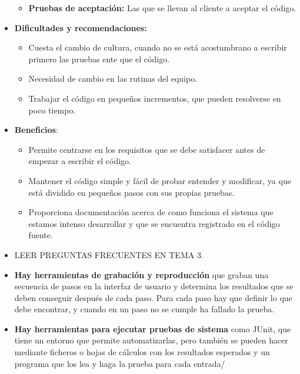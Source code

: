 \documentclass[12pt, twoside, openright]{report} %
\begin{document}
\begin{itemize}
\begin{itemize}
  \item \textbf{Pruebas de aceptación:} Las que se llevan al cliente a
    aceptar el código.
    
  \end{itemize}
\item \textbf{Dificultades y recomendaciones:}
  

  \begin{itemize}
  \item Cuesta el cambio de cultura, cuando no se está acostumbrano a
    escribir primero las pruebas ente que el código.
    
  \item Necesidad de cambio en las rutinas del equipo.
    
  \item Trabajar el código en pequeños incrementos, que pueden resolverse en
    poco tiempo.
    
  \end{itemize}
\item \textbf{Beneficios}:
  

  \begin{itemize}
  \item Permite centrarse en los requisitos que se debe satisfacer antes de
    empezar a escribir el código.
    
  \item Mantener el código simple y fácil de probar entender y modificar, ya
    que está dividido en pequeños pasos con sus propias pruebas.
    
  \item Proporciona documentación acerca de como funciona el sistema que
    estamos intenso desarrollar y que se encuentra registrado en el
    código fuente.
    
  \end{itemize}
\item LEER PREGUNTAS FRECUENTES EN TEMA 3.
  
\item \textbf{Hay herramientas de grabación y reproducción} que graban una
  secuencia de pasos en la interfaz de usuario y determina los
  resultados que se deben conseguir después de cada paso. Para cada paso
  hay que definir lo que debe encontrar, y cuando en un paso no se
  cumple ha fallado la prueba.
  
\item \textbf{Hay herramientas para ejecutar pruebas de sistema} como JUnit,
  que tiene un entorno que permite automatizarlas, pero también se
  pueden hacer mediante ficheros o hojas de cálculos con los resultados
  esperados y un programa que los lea y haga la prueba para cada
  entrada/
  
\end{itemize}
\end{document}
